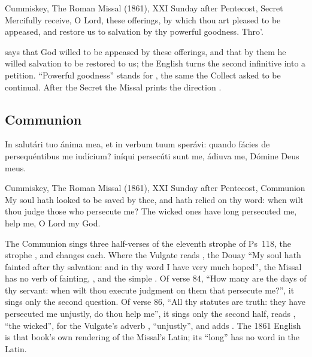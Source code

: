 \begin{englishwitness}{Cummiskey, The Roman Missal (1861), XXI Sunday after Pentecost, Secret}
Mercifully receive, O Lord, these offerings, by which thou art pleased to be
appeased, and restore us to salvation by thy powerful goodness. Thro'.
\end{englishwitness}

\noindent {} says that God willed to be
appeased by these offerings, and  that by them he willed salvation to be restored to us; the English
turns the second infinitive into a petition. ``Powerful goodness'' stands for
, the same  the Collect asked to be
continual. After the Secret the Missal prints the direction .

\subsection{Communion}
\label{proper-communion}


\begin{latinproper}
In salutári tuo ánima mea, et in verbum tuum sperávi: quando fácies de
persequéntibus me iudícium? iníqui persecúti sunt me, ádiuva me, Dómine Deus
meus.
\end{latinproper}

\begin{englishwitness}{Cummiskey, The Roman Missal (1861), XXI Sunday after Pentecost, Communion}
My soul hath looked to be saved by thee, and hath relied on thy word: when wilt
thou judge those who persecute me? The wicked ones have long persecuted me, help
me, O Lord my God.
\end{englishwitness}

\noindent The Communion sings three half-verses of the eleventh strophe of
Ps~118, the strophe , and changes each. Where the Vulgate reads
, the
Douay ``My soul hath fainted after thy salvation: and in thy word I have very
much hoped'', the Missal has no verb of fainting, , and the simple . Of verse 84, ``How many are the days of thy
servant: when wilt thou execute judgment on them that persecute me?'', it sings
only the second question. Of verse 86, ``All thy statutes are truth: they have
persecuted me unjustly, do thou help me'', it sings only the second half, reads
, ``the wicked'', for the Vulgate's adverb ,
``unjustly'', and adds . The 1861 English is that book's
own rendering of the Missal's Latin; its ``long'' has no word in the Latin.

